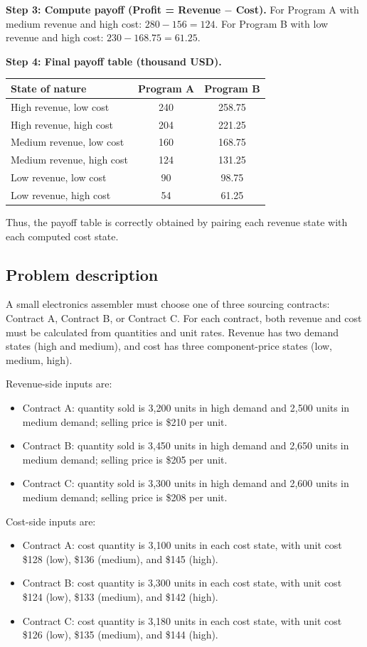 \begin{ExamProblems}
		\textbf{Step 3: Compute payoff (Profit = Revenue $-$ Cost).}
		For Program A with medium revenue and high cost: \(280-156=124\).
		For Program B with low revenue and high cost: \(230-168.75=61.25\).
		
		\textbf{Step 4: Final payoff table (thousand USD).}
		\begin{center}
			\begin{tabular}{l c c}
				\toprule
				State of nature & Program A & Program B \\
				\midrule
				High revenue, low cost & 240 & 258.75 \\
				High revenue, high cost & 204 & 221.25 \\
				Medium revenue, low cost & 160 & 168.75 \\
				Medium revenue, high cost & 124 & 131.25 \\
				Low revenue, low cost & 90 & 98.75 \\
				Low revenue, high cost & 54 & 61.25 \\
				\bottomrule
			\end{tabular}
		\end{center}
		
		Thus, the payoff table is correctly obtained by pairing each revenue state with each computed cost state.
		
		\item
		\subsection*{Problem description}
		A small electronics assembler must choose one of three sourcing contracts: Contract A, Contract B, or Contract C.
		For each contract, both revenue and cost must be calculated from quantities and unit rates.
		Revenue has two demand states (high and medium), and cost has three component-price states (low, medium, high).
		
		Revenue-side inputs are:
		\begin{itemize}
			\item Contract A: quantity sold is 3{,}200 units in high demand and 2{,}500 units in medium demand; selling price is \$210 per unit.
			\item Contract B: quantity sold is 3{,}450 units in high demand and 2{,}650 units in medium demand; selling price is \$205 per unit.
			\item Contract C: quantity sold is 3{,}300 units in high demand and 2{,}600 units in medium demand; selling price is \$208 per unit.
		\end{itemize}
		Cost-side inputs are:
		\begin{itemize}
			\item Contract A: cost quantity is 3{,}100 units in each cost state, with unit cost \$128 (low), \$136 (medium), and \$145 (high).
			\item Contract B: cost quantity is 3{,}300 units in each cost state, with unit cost \$124 (low), \$133 (medium), and \$142 (high).
			\item Contract C: cost quantity is 3{,}180 units in each cost state, with unit cost \$126 (low), \$135 (medium), and \$144 (high).
		\end{itemize}
		

\end{ExamProblems}

